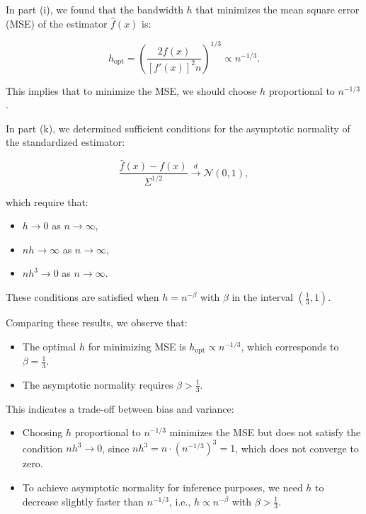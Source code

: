 \documentclass{article}
\begin{document}
In part (i), we found that the bandwidth \( h \) that minimizes the mean square error (MSE) of the estimator \( \hat{f}(x) \) is:

\[
h_{\text{opt}} = \left( \frac{2 f(x)}{[f'(x)]^2 n} \right)^{1/3} \propto n^{-1/3}.
\]

This implies that to minimize the MSE, we should choose \( h \) proportional to \( n^{-1/3} \).

In part (k), we determined sufficient conditions for the asymptotic normality of the standardized estimator:

\[
\frac{\hat{f}(x) - f(x)}{\Sigma^{1/2}} \xrightarrow{d} \mathcal{N}(0, 1),
\]

which require that:

\begin{itemize}
    \item \( h \to 0 \) as \( n \to \infty \),
    \item \( n h \to \infty \) as \( n \to \infty \),
    \item \( n h^3 \to 0 \) as \( n \to \infty \).
\end{itemize}

These conditions are satisfied when \( h = n^{-\beta} \) with \( \beta \) in the interval \( \left( \frac{1}{3}, 1 \right) \).

Comparing these results, we observe that:

\begin{itemize}
    \item The optimal \( h \) for minimizing MSE is \( h_{\text{opt}} \propto n^{-1/3} \), which corresponds to \( \beta = \frac{1}{3} \).
    \item The asymptotic normality requires \( \beta > \frac{1}{3} \).
\end{itemize}

This indicates a trade-off between bias and variance:

\begin{itemize}
    \item Choosing \( h \) proportional to \( n^{-1/3} \) minimizes the MSE but does not satisfy the condition \( n h^3 \to 0 \), since \( n h^3 = n \cdot (n^{-1/3})^3 = 1 \), which does not converge to zero.
    \item To achieve asymptotic normality for inference purposes, we need \( h \) to decrease slightly faster than \( n^{-1/3} \), i.e., \( h \propto n^{-\beta} \) with \( \beta > \frac{1}{3} \).
\end{itemize}
\end{document}
